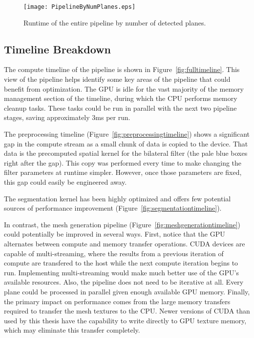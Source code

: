 \begin{figure}[!htpb]
    \centering
    \texttt{[image: PipelineByNumPlanes.eps]}
    \caption{Runtime of the entire pipeline by number of detected planes.}
    \label{fig:pipelineplanes}
\end{figure}


\subsection{Timeline Breakdown}
The compute timeline of the pipeline is shown in Figure~\ref{fig:fulltimeline}. This view of the pipeline helps identify some key areas of the pipeline that could benefit from optimization. The GPU is idle for the vast majority of the memory management section of the timeline, during which the CPU performs memory cleanup tasks.  These tasks could be run in parallel with the next two pipeline stages, saving approximately 3ms per run.\par
The preprocessing timeline (Figure~\ref{fig:preprocessingtimeline}) shows a significant gap in the compute stream as a small chunk of data is copied to the device. That data is the precomputed spatial kernel for the bilateral filter (the pale blue boxes right after the gap). This copy was performed every time to make changing the filter parameters at runtime simpler. However, once those parameters are fixed, this gap could easily be engineered away.\par 
The segmentation kernel has been highly optimized and offers few potential sources of performance improvement (Figure~\ref{fig:segmentationtimeline}).\par 
In contrast, the mesh generation pipeline (Figure~\ref{fig:meshgenerationtimeline}) could potentially be improved in several ways. First, notice that the GPU alternates between compute and memory transfer operations. CUDA devices are capable of multi-streaming, where the results from a previous iteration of compute are transfered to the host while the next compute iteration begins to run. Implementing multi-streaming would make much better use of the GPU's available resources. Also, the pipeline does not need to be iterative at all. Every plane could be processed in parallel given enough available GPU memory. Finally, the primary impact on performance comes from the large memory transfers required to transfer the mesh textures to the CPU. Newer versions of CUDA than used by this thesis have the capability to write directly to GPU texture memory, which may eliminate this transfer completely.

